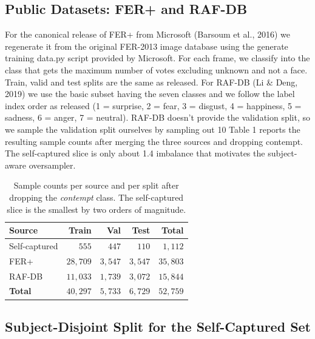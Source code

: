 \documentclass[12pt,a4paper]{article}
\begin{document}
\subsection{Public Datasets: FER+ and RAF-DB}
\label{sec:data:public}

For the canonical release of FER+ from Microsoft (Barsoum et al., 2016) we regenerate it from the original FER-2013 image database using the generate training data.py script provided by Microsoft. For each frame, we classify into the class that gets the maximum number of votes excluding unknown and not a face. Train, valid and test splits are the same as released.
For RAF-DB (Li & Deng, 2019) we use the basic subset having the seven classes and we follow the label index order as released (1 = surprise, 2 = fear, 3 = disgust, 4 = happiness, 5 = sadness, 6 = anger, 7 = neutral). RAF-DB doesn't provide the validation split, so we sample the validation split ourselves by sampling out 10%
Table 1 reports the resulting sample counts after merging the three sources and dropping
contempt. The self-captured slice is only about 1.4%
imbalance that motivates the subject-aware oversampler.

\begin{table}[H]
  \centering
  \footnotesize
  \begin{tabular}{lrrrr}
    \toprule
    Source & Train & Val & Test & Total \\
    \midrule
    Self-captured & $555$  & $447$  & $110$  & $1{,}112$ \\
    FER+          & $28{,}709$ & $3{,}547$ & $3{,}547$ & $35{,}803$ \\
    RAF-DB        & $11{,}033$ & $1{,}739$ & $3{,}072$ & $15{,}844$ \\
    \midrule
    \textbf{Total} & $40{,}297$ & $5{,}733$ & $6{,}729$ & $52{,}759$ \\
    \bottomrule
  \end{tabular}
  \caption{\footnotesize Sample counts per source and per split after dropping
  the \emph{contempt} class. The self-captured slice is the
  smallest by two orders of magnitude.}
  \label{tab:datasummary}
\end{table}

\subsection{Subject-Disjoint Split for the Self-Captured Set}
\label{sec:data:split}
\end{document}
